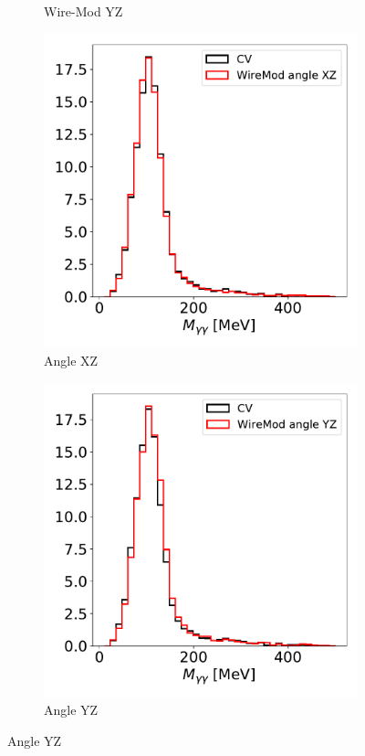 \documentclass[a4paper]{article}
\begin{document}
\begin{figure}[H]
\begin{center}
\begin{subfigure}[b]{0.24\textwidth}
    \caption{\label{fig:detsys:pi0mass:WMYZ}Wire-Mod YZ}
    \end{subfigure}
    \begin{subfigure}[b]{0.24\textwidth}
    \centering
    \includegraphics[width=1.00\textwidth]{detsys/pi0/pi0_mass_Y_03232020_WireMod_angle_XZ.pdf}
    \caption{\label{fig:detsys:pi0mass:WAXZ}Angle XZ}
    \end{subfigure}
    \begin{subfigure}[b]{0.24\textwidth}
    \centering
    \includegraphics[width=1.00\textwidth]{detsys/pi0/pi0_mass_Y_03232020_WireMod_angle_YZ.pdf}
    \caption{\label{fig:detsys:pi0mass:WMAYZ}Angle YZ}
    \end{subfigure}
   

\end{center}
\end{figure}
\end{document}
